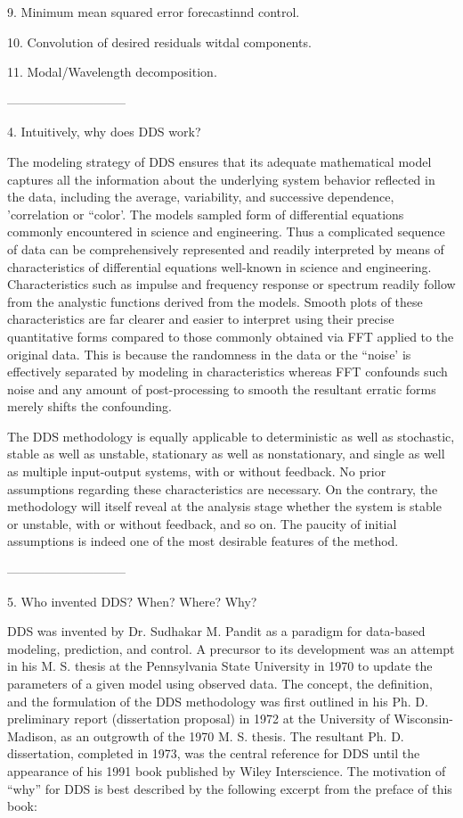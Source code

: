     9. Minimum mean squared error forecastinnd control.
 
   10. Convolution of desired residuals witdal components.
 
   11. Modal/Wavelength decomposition.
 
-----------------------------
 
4. Intuitively, why does DDS work?
 
The modeling strategy of DDS ensures that its
adequate mathematical model captures all the
information about the underlying system behavior
reflected in the data, including the average,
variability, and successive dependence,
'correlation or ``color'.  The models sampled form
of differential equations commonly encountered in
science and engineering.  Thus a complicated
sequence of data can be comprehensively
represented and readily interpreted by means of
characteristics of differential equations
well-known in science and engineering.
Characteristics such as impulse and frequency
response or spectrum readily follow from the
analystic functions derived from the models.
Smooth plots of these characteristics are far
clearer and easier to interpret using their
precise quantitative forms compared to those
commonly obtained via FFT applied to the original
data.  This is because the randomness in the data
or the ``noise' is effectively separated by
modeling in characteristics whereas FFT confounds
such noise and any amount of post-processing to
smooth the resultant erratic forms merely shifts
the confounding.
 
The DDS methodology is equally applicable to
deterministic as well as stochastic, stable as
well as unstable, stationary as well as
nonstationary, and single as well as multiple
input-output systems, with or without feedback.
No prior assumptions regarding these
characteristics are necessary.  On the contrary,
the methodology will itself reveal at the analysis
stage whether the system is stable or unstable,
with or without feedback, and so on.  The paucity
of initial assumptions is indeed one of the most
desirable features of the method.
 
-----------------------------
 
5. Who invented DDS? When? Where? Why?
 
DDS was invented by Dr.  Sudhakar M. Pandit as a
paradigm for data-based modeling, prediction, and
control.  A precursor to its development was an
attempt in his M. S. thesis at the Pennsylvania
State University in 1970 to update the parameters
of a given model using observed data.  The
concept, the definition, and the formulation of
the DDS methodology was first outlined in his Ph.
D. preliminary report (dissertation proposal) in
1972 at the University of Wisconsin-Madison, as an
outgrowth of the 1970 M. S. thesis.  The resultant
Ph.  D. dissertation, completed in 1973, was the
central reference for DDS until the appearance of
his 1991 book published by Wiley Interscience.
The motivation of ``why'' for DDS is best
described by the following excerpt from the
preface of this book:
 
